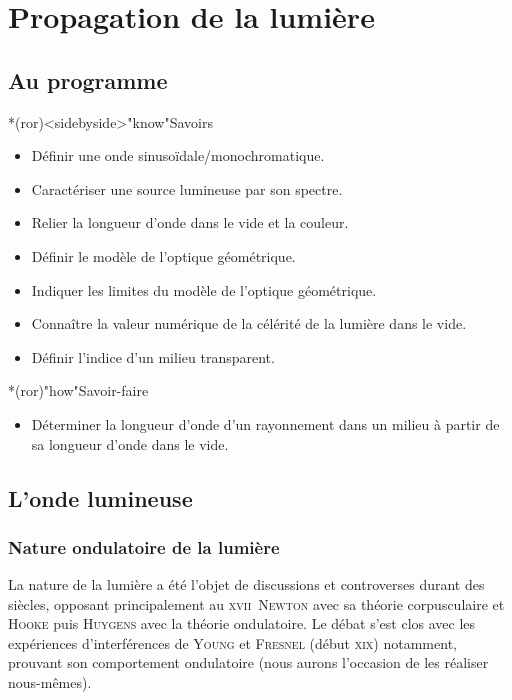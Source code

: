 \documentclass[../../main/main.tex]{subfiles}
\begin{document}
\chapter{Propagation de la lumi\`ere}

\section*{Au programme}
\begin{tcb}*(ror)<sidebyside>"know"{Savoirs}
	\begin{itemize}[label=$\diamond$, leftmargin=10pt]
		\item Définir une onde sinusoïdale/monochromatique.
		\item Caractériser une source lumineuse par son spectre.
		\item Relier la longueur d'onde dans le vide et la couleur.
		\item Définir le modèle de l'optique géométrique.
	\end{itemize}
	\tcblower
	\begin{itemize}[label=$\diamond$, leftmargin=10pt]
		\item Indiquer les limites du modèle de l'optique géométrique.
		\item Connaître la valeur numérique de la célérité de la lumière dans le
		      vide.
		\item Définir l'indice d'un milieu transparent.
	\end{itemize}
\end{tcb}

\begin{tcb}*(ror)"how"{Savoir-faire}
	\begin{itemize}[label=$\diamond$, leftmargin=10pt]
		\item Déterminer la longueur d'onde d'un rayonnement dans un milieu à partir
		      de sa longueur d'onde dans le vide.
	\end{itemize}
\end{tcb}

\section{L'onde lumineuse}

\subsection{Nature ondulatoire de la lumière}

La nature de la lumière a été l'objet de discussions et controverses durant des
siècles, opposant principalement au \textsc{xvii}\ieme\ \textsc{Newton} avec sa
théorie corpusculaire et \textsc{Hooke} puis \textsc{Huygens} avec la théorie
ondulatoire. Le débat s'est clos avec les expériences d'interférences de
\textsc{Young} et \textsc{Fresnel} (début \textsc{xix}\ieme) notamment, prouvant
son comportement ondulatoire (nous aurons l'occasion de les réaliser
nous-mêmes).
\end{document}
